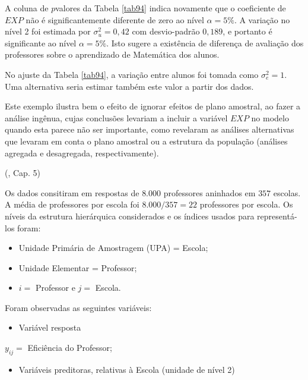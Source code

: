 \documentclass[]{book}
\providecommand{\tightlist}{%
  \setlength{\itemsep}{0pt}\setlength{\parskip}{0pt}}
\numberwithin{example}{chapter}
\numberwithin{remark}{chapter}
\numberwithin{definition}{chapter}
\let\BeginKnitrBlock\begin \let\EndKnitrBlock\end
\begin{document}
A coluna de \(p\)valores da Tabela \ref{tab94} indica novamente que o
coeficiente de \(EXP\) não é significantemente diferente de zero ao
nível \(\alpha =5\%\). A variação no nível 2 foi estimada por
\(\sigma_{u}^{2}=0,42\) com desvio-padrão \(0,189\), e portanto é
significante ao nível \(\alpha =5\%\). Isto sugere a existência de
diferença de avaliação dos professores sobre o aprendizado de Matemática
dos alunos.

No ajuste da Tabela \ref{tab94}, a variação entre alunos foi tomada como
\(\sigma _{e}^{2}=1.\) Uma alternativa seria estimar também este valor a
partir dos dados.

Este exemplo ilustra bem o efeito de ignorar efeitos de plano amostral,
ao fazer a análise ingênua, cujas conclusões levariam a incluir a
variável \(EXP\) no modelo quando esta parece não ser importante, como
revelaram as análises alternativas que levaram em conta o plano amostral
ou a estrutura da população (análises agregada e desagregada,
respectivamente).\pagebreak 

\BeginKnitrBlock{example}
\protect\hypertarget{ex:unnamed-chunk-110}{}{\label{ex:unnamed-chunk-110}}(\citep{bryk},
Cap. 5)
\EndKnitrBlock{example}

Os dados consitiram em respostas de \(8.000\) professores aninhados em
\(357\) escolas. A média de professores por escola foi \(8.000/357=22\)
professores por escola. Os níveis da estrutura hierárquica considerados
e os índices usados para representá-los foram:

\begin{itemize}
\item
  Unidade Primária de Amostragem (UPA) = Escola;
\item
  Unidade Elementar = Professor;
\item
  \(i=\) Professor e \(j=\) Escola.
\end{itemize}

Foram observadas as seguintes variáveis:

\begin{itemize}
\tightlist
\item
  Variável resposta
\end{itemize}

\(y_{ij}=\) Eficiência do Professor;

\begin{itemize}
\tightlist
\item
  Variáveis preditoras, relativas à Escola (unidade de nível 2)
\end{itemize}
\end{document}
